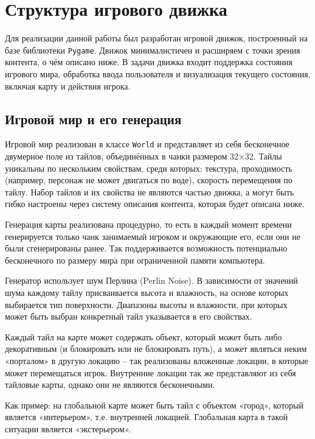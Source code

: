 \documentclass[14pt]{extarticle}
\begin{document}
\newpage
\section{Структура игрового движка}

Для реализации данной работы был разработан игровой движок, построенный на базе библиотеки \texttt{Pygame}. Движок минималистичен и расширяем с точки зрения контента, о чём описано ниже. В задачи движка входит поддержка состояния игрового мира, обработка ввода пользователя и визуализация текущего состояния, включая карту и действия игрока.

\subsection{Игровой мир и его генерация}
    
Игровой мир реализован в классе \texttt{World} и представляет из себя бесконечное двумерное поле из тайлов, объединённых в чанки размером 32×32. Тайлы уникальны по нескольким свойствам, среди которых: текстура, проходимость (например, персонаж не может двигаться по воде), скорость перемещения по тайлу. Набор тайлов и их свойства не являются частью движка, а могут быть гибко настроены через систему описания контента, которая будет описана ниже.

Генерация карты реализована процедурно, то есть в каждый момент времени генерируется только чанк занимаемый игроком и окружающие его, если они не были сгенерированы ранее. Так поддерживается возможность потенциально бесконечного по размеру мира при ограниченной памяти компьютера.

Генератор использует шум Перлина (Perlin Noise)\cite{perlin}. В зависимости от значений шума каждому тайлу присваивается высота и влажность, на основе которых выбирается тип поверхности. Диапазоны высоты и влажности, при которых может быть выбран конкретный тайл указывается в его свойствах.

Каждый тайл на карте может содержать объект, который может быть либо декоративным (и блокировать или не блокировать путь), а может являться неким «порталом» в другую локацию -- так реализованы вложенные локации, в которые может перемещаться игрок. Внутренние локации так же представляют из себя тайловые карты, однако они не являются бесконечными.

Как пример: на глобальной карте может быть тайл с объектом «город», который является «интерьером», т.е. внутренней локацией. Глобальная карта в такой ситуации является «экстерьером».
\end{document}
